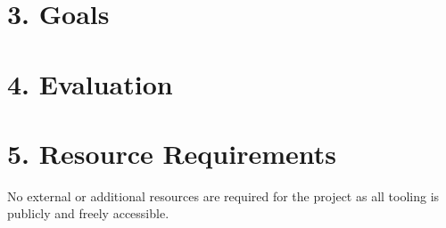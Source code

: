 \documentclass[11pt, a4paper, twoside, openright]{report}
\begin{document}
\section*{3. Goals}

\section*{4. Evaluation}

\section*{5. Resource Requirements}

No external or additional resources are required for the project as all tooling is publicly and freely accessible.

\backmatter

%


\end{document}
